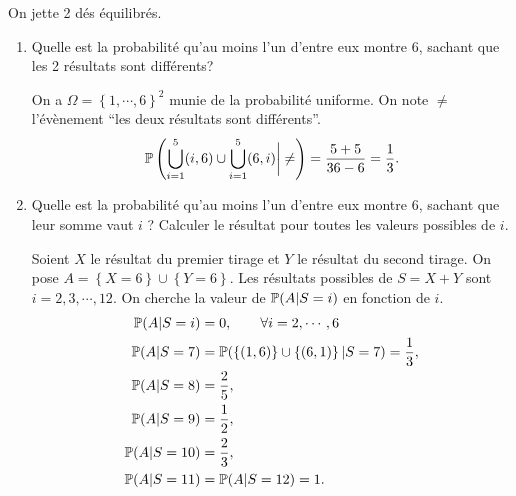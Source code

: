 \documentclass[a4paper]{tp_um}
\begin{document}
\exo{} On jette 2 dés équilibrés.
\begin{enumerate}
\item Quelle est la probabilité qu'au moins l'un d'entre eux montre 6, sachant que les 2 résultats sont différents?

	On a $\Omega = \left\{ 1,\cdots,6 \right\}^2$ munie de la probabilité uniforme. On note $\neq$ l'évènement ``les deux résultats sont différents''. 
	\[
		\P\left( \bigcup_{i=1}^5 (i,6) \cup \bigcup_{i=1}^5 (6,i) \bigg\vert \neq \right) = \frac{5+5}{36 -6} = \frac 1 3.
	\]

\item Quelle est la probabilité qu'au moins l'un d'entre eux montre 6, sachant
que leur somme vaut $i$ ? Calculer le résultat pour toutes les valeurs possibles de $i$.

\bigskip

Soient $X$ le résultat du premier tirage et   $Y$ le résultat du second tirage. On pose $A = \left\{ X=6 \right\} \cup \left\{ Y=6 \right\}$. Les résultats possibles de $S = X+Y$ sont $i = 2,3,\cdots,12$. On cherche la valeur de $\P(A | S = i)$ en fonction de $i$.
\begin{align*}
	\P(A | S=i) & = 0, \qquad \forall i =2, \cdots,6 \\
\P(A | S=7) &= \P( \left\{ (1,6) \right\} \cup \left\{ (6,1) \right\} | S=7 ) = \frac 1 3,\\
\P(A | S=8) & = \frac 2 5 ,\\
\P(A | S=9) & = \frac 1 2 ,\\
\P(A | S=10)& = \frac 2 3 ,\\
\P(A | S=11) & = \P(A| S=12) =1.
\end{align*}


\end{enumerate}
\end{document}
